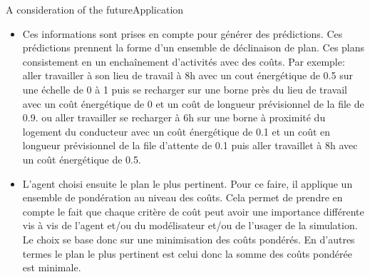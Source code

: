 \begin{frame}{A consideration of the future}{Application}
{\begin{itemize}
    \item Ces informations sont prises en compte pour générer des prédictions. Ces prédictions prennent la forme d'un ensemble de déclinaison de plan. Ces plans consistement en un enchaînement d'activités avec des coûts. Par exemple: aller travailler à son lieu de travail à 8h avec un cout énergétique de 0.5 sur une échelle de 0 à 1 puis se recharger sur une borne près du lieu de travail avec un coût énergétique de 0 et un coût de longueur prévisionnel de la file de 0.9. ou aller travailler se recharger à 6h sur une borne à proximité du logement du conducteur avec un coût énergétique de 0.1 et un coût en longueur prévisionnel de la file d'attente de 0.1 puis aller travaillet à 8h avec un coût énergétique de 0.5. 
    \item L'agent choisi ensuite le plan le plus pertinent. Pour ce faire, il applique un ensemble de pondération au niveau des coûts. Cela permet de prendre en compte le fait que chaque critère de coût peut avoir une importance différente vis à vis de l'agent et/ou du modélisateur et/ou de l'usager de la simulation. Le choix se base donc sur une minimisation des coûts pondérés. En d'autres termes le plan le plus pertinent est celui donc la somme des coûts pondérée est minimale.
\end{itemize}
}

\end{frame}

